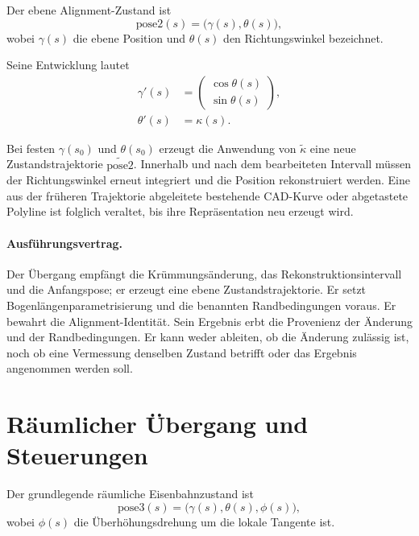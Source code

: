 \begin{definition}[pose2]
\label{def:notation-pose2}
Der ebene Alignment-Zustand ist
\begin{equation}
\mathrm{pose2}(s)=\bigl(\gamma(s),\theta(s)\bigr),
\label{eq:pose2-definition}
\end{equation}
wobei \(\gamma(s)\) die ebene Position und \(\theta(s)\) den
Richtungswinkel bezeichnet.
\end{definition}

Seine Entwicklung lautet
\begin{equation}
\begin{aligned}
\gamma'(s)&=
\begin{pmatrix}\cos\theta(s)\\\sin\theta(s)\end{pmatrix},\\
\theta'(s)&=\kappa(s).
\end{aligned}
\label{eq:pose2-evolution}
\end{equation}

Bei festen \(\gamma(s_0)\) und \(\theta(s_0)\) erzeugt die Anwendung von
\(\widetilde\kappa\) eine neue Zustandstrajektorie
\(\widetilde{\mathrm{pose2}}\). Innerhalb und nach dem bearbeiteten Intervall
müssen der Richtungswinkel erneut integriert und die Position rekonstruiert
werden. Eine aus der früheren Trajektorie abgeleitete bestehende CAD-Kurve
oder abgetastete Polyline ist folglich veraltet, bis ihre Repräsentation neu
erzeugt wird.

\paragraph{Ausführungsvertrag.}
Der Übergang empfängt die Krümmungsänderung, das Rekonstruktionsintervall und
die Anfangspose; er erzeugt eine ebene Zustandstrajektorie. Er setzt
Bogenlängenparametrisierung und die benannten Randbedingungen voraus. Er
bewahrt die Alignment-Identität. Sein Ergebnis erbt die Provenienz der
Änderung und der Randbedingungen. Er kann weder ableiten, ob die Änderung
zulässig ist, noch ob eine Vermessung denselben Zustand betrifft oder das
Ergebnis angenommen werden soll.

\section{Räumlicher Übergang und Steuerungen}

\begin{definition}
\label{def:pose3}
Der grundlegende räumliche Eisenbahnzustand ist
\begin{equation}
\mathrm{pose3}(s)=\bigl(\gamma(s),\theta(s),\phi(s)\bigr),
\label{eq:pose3-definition}
\end{equation}
wobei \(\phi(s)\) die Überhöhungsdrehung um die lokale Tangente ist.
\end{definition}

